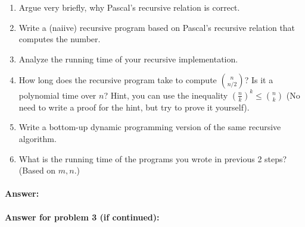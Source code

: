 \documentclass{article}
\begin{document}
\begin{enumerate}[label=\alph*]
\item Argue very briefly, why Pascal's recursive relation is correct.
\item Write a (naiive) recursive program based on Pascal's recursive relation that computes the number.
\item Analyze the running time of your recursive implementation.
\item How long does the recursive program take to compute ${n \choose n/2}$? Is it a polynomial time over $n$? Hint, you can use the inequality $(\frac{n}{k})^k \leq {n \choose k}$ (No need to write a proof for the hint, but try to prove it yourself).
\item Write a bottom-up dynamic programming version of the same recursive algorithm.
\item What is the running time of the programs you wrote in previous 2 steps? (Based on $m,n$.)
\end{enumerate}


\paragraph{Answer:}




\newpage
\paragraph{Answer for problem 3 (if continued):}
\end{document}
